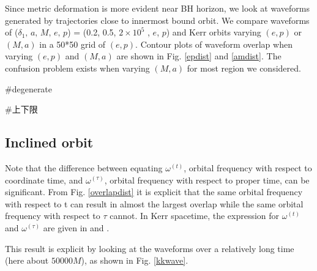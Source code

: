 \documentclass{article}
\begin{document}
Since metric deformation is more evident near BH horizon, we look at waveforms generated by trajectories close to innermost bound orbit. We compare waveforms of ($\delta_1,\, a,\, M,\, e,\, p$) = (0.2, 0.5, $2 \times 10^5 $ , $e$, $p$) and Kerr orbits varying $(e,p)$ or $(M,a)$ in a 50*50 grid of $(e,p)$. Contour plots of waveform overlap when varying $(e,p)$ and $(M,a)$ are shown in Fig. \ref{epdist} and \ref{amdist}. The confusion problem exists when varying $(M,a)$ for most region we considered. 

#degenerate

#上下限

\subsection{Inclined orbit}
\label{p_3d}



Note that the difference between equating $\omega^{(t)}$, orbital frequency with respect to coordinate time, and $\omega^{(\tau)}$, orbital frequency with respect to proper time, can be significant. From Fig. \ref{overlapdist} it is explicit that the same orbital frequency with respect to t can result in almost the largest overlap while the same orbital frequency with respect to $\tau$ cannot. In Kerr spacetime, the expression for $\omega^{(t)}$ and $\omega^{(\tau)}$ are given in \cite{tOmg} and \cite{tauOmg}.


This result is explicit by looking at the waveforms over a relatively long time (here about $50000M$), as shown in Fig. \ref{kkwave}. 
\end{document}
